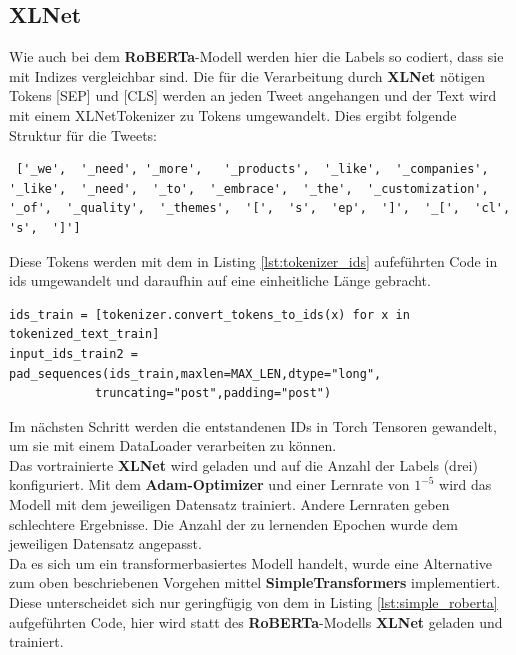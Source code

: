 \subsection{XLNet}
Wie auch bei dem \textbf{RoBERTa}-Modell werden hier die Labels so codiert, dass sie mit Indizes vergleichbar sind. Die f\"ur die Verarbeitung durch \textbf{XLNet} n\"otigen Tokens [SEP] und [CLS] werden an jeden Tweet angehangen und der Text wird mit einem XLNetTokenizer zu Tokens umgewandelt. Dies ergibt folgende Struktur f\"ur die Tweets:
\lstset{language=Python}
\lstset{frame=lines}
\lstset{captionpos=b}
\lstset{basicstyle=\footnotesize}
\begin{lstlisting}
 ['_we',  '_need', '_more',   '_products',  '_like',  '_companies',  '_like',  '_need',  '_to',  '_embrace',  '_the',  '_customization',  '_of',  '_quality',  '_themes',  '[',  's',  'ep',  ']',  '_[',  'cl',  's',  ']']
\end{lstlisting}
Diese Tokens werden mit dem in Listing \ref{lst:tokenizer_ids} aufef\"uhrten Code in ids umgewandelt und daraufhin auf eine einheitliche L\"ange gebracht.
\lstset{language=Python}
\lstset{frame=lines}
\lstset{captionpos=b}
\lstset{basicstyle=\footnotesize}
\begin{lstlisting}
ids_train = [tokenizer.convert_tokens_to_ids(x) for x in tokenized_text_train]
input_ids_train2 = pad_sequences(ids_train,maxlen=MAX_LEN,dtype="long",
			truncating="post",padding="post")
\end{lstlisting}
Im n\"achsten Schritt werden die entstandenen IDs in Torch Tensoren gewandelt, um sie mit einem DataLoader verarbeiten zu k\"onnen.\\
Das vortrainierte \textbf{XLNet} wird geladen und auf die Anzahl der Labels (drei) konfiguriert. Mit dem \textbf{Adam-Optimizer} und einer Lernrate von $1^{-5}$ wird das Modell mit dem jeweiligen Datensatz trainiert. Andere Lernraten geben schlechtere Ergebnisse. Die Anzahl der zu lernenden Epochen wurde dem jeweiligen Datensatz angepasst.\\
Da es sich um ein transformerbasiertes Modell handelt, wurde eine Alternative zum oben beschriebenen Vorgehen mittel \textbf{SimpleTransformers} implementiert. Diese unterscheidet sich nur geringf\"ugig von dem in Listing \ref{lst:simple_roberta} aufgef\"uhrten Code, hier wird statt des \textbf{RoBERTa}-Modells \textbf{XLNet} geladen und trainiert.

